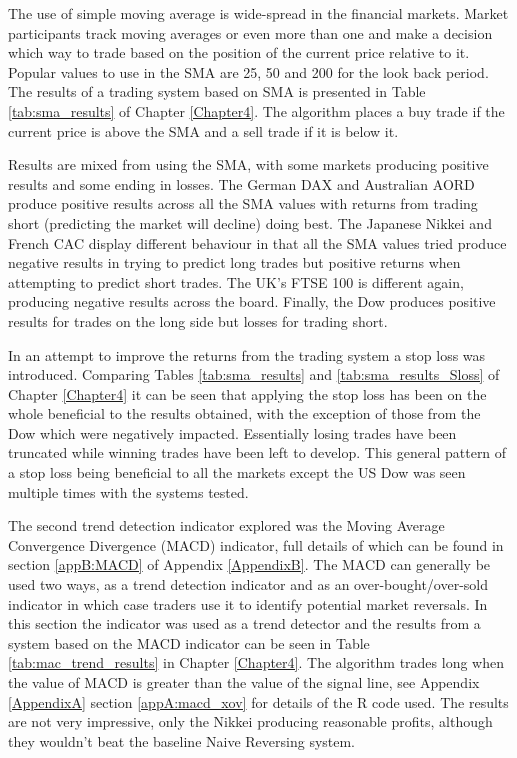The use of simple moving average is wide-spread in the financial markets. Market participants track moving averages or even more than one and make a decision which way to trade based on the position of the current price relative to it. Popular values to use in the SMA are 25, 50 and 200 for the look back period. The results of a trading system based on SMA is presented in Table \ref{tab:sma_results} of Chapter \ref{Chapter4}. The algorithm places a buy trade if the current price is above the SMA and a sell trade if it is below it. 

Results are mixed from using the SMA, with some markets producing positive results and some ending in losses. The German DAX and Australian AORD produce positive results across all the SMA values with returns from trading short (predicting the market will decline) doing best.  The Japanese Nikkei and French CAC display different behaviour in that all the SMA values tried produce negative results in trying to  predict long trades but positive returns when attempting to predict short trades.  The UK's FTSE 100 is different again, producing negative results across the board. Finally, the Dow produces positive results for trades on the long side but losses for trading short.


In an attempt to improve the returns from the trading system a stop loss was introduced. Comparing Tables \ref{tab:sma_results} and \ref{tab:sma_results_Sloss} of Chapter \ref{Chapter4}
it can be seen that applying the stop loss has been on the whole beneficial to the results obtained, with the exception of those from the Dow which were negatively impacted. Essentially losing trades have been truncated while winning trades have been left to develop. This general pattern of a stop loss being beneficial to all the markets except the US Dow was seen multiple times with the systems tested.

The second trend detection indicator explored was the Moving Average Convergence Divergence (MACD) indicator, full details of which can be found in section \ref{appB:MACD} of Appendix \ref{AppendixB}. The MACD can generally be used two ways, as a trend detection indicator and as an over-bought/over-sold indicator in which case traders use it to identify potential market reversals. In this section the indicator was used as a trend detector and the results from a system based on the MACD indicator can be seen in Table \ref{tab:mac_trend_results} in Chapter \ref{Chapter4}.  The algorithm trades long when the value of MACD is greater than the value of the signal line, see Appendix \ref{AppendixA} section \ref{appA:macd_xov} for details of the R code used. The results are not very impressive, only the Nikkei producing reasonable profits, although they wouldn't beat the baseline Naive Reversing system.

